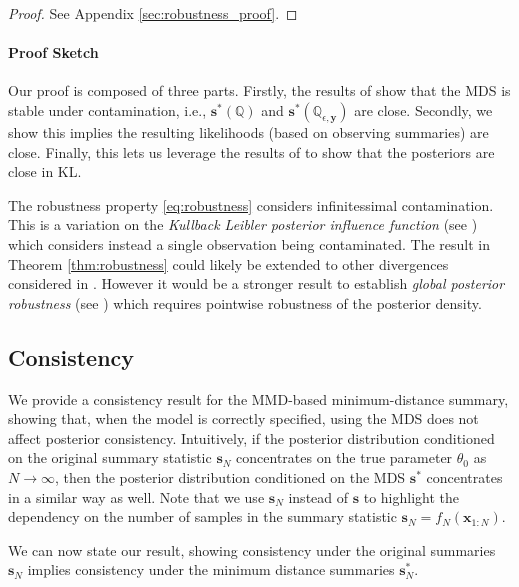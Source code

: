 \documentclass{article}
\theoremstyle{plain}
\theoremstyle{definition}
\theoremstyle{remark}
\begin{document}
\begin{proof}
See Appendix \ref{sec:robustness_proof}.
\end{proof}
\paragraph{Proof Sketch} Our proof is composed of three parts. Firstly, the results of \citet{briolStatisticalInferenceGenerative2019b} show that the MDS is stable under contamination, i.e., $\mathbf{s}^*(\mathbb{Q})$ and $\mathbf{s}^*(\mathbb{Q}_{\epsilon, \mathbf{y}})$ are close. Secondly, we show this implies the resulting likelihoods (based on observing summaries) are close.
Finally, this lets us leverage the results of \citet{sprungkLocalLipschitzStability2020a} to show that the posteriors are close in KL. 

The robustness property \eqref{eq:robustness} considers infinitessimal contamination.
This is a variation on the \emph{Kullback Leibler posterior influence function}
(see \citealp{bharti2026amortised}) which considers instead a single observation being contaminated.
The result in Theorem \ref{thm:robustness} could likely be extended to other divergences
considered in \citet{sprungkLocalLipschitzStability2020a}.
However it would be a stronger result to establish \emph{global posterior robustness} (see \citealp{bharti2026amortised})
which requires pointwise robustness of the posterior density.

\subsection{Consistency}

We provide a consistency result for the MMD-based minimum-distance summary, showing that, when the model is correctly specified, using the MDS does not affect posterior consistency. Intuitively, if the posterior distribution conditioned on the original summary statistic \( \mathbf{s}_N \) concentrates on the true parameter \( \theta_0 \) as \( N \to \infty \), then the posterior distribution conditioned on the MDS \( \mathbf{s}^* \) concentrates in a similar way as well. Note that we use \( \mathbf{s}_N \) instead of \( \mathbf{s} \) to highlight the dependency on the number of samples in the summary statistic \( \mathbf{s}_N = f_N(\mathbf{x}_{1:N}) \). 

We can now state our result, showing consistency under the original summaries $\mathbf{s}_N$ implies consistency under the minimum distance summaries $\mathbf{s}^*_N$.
\end{document}
